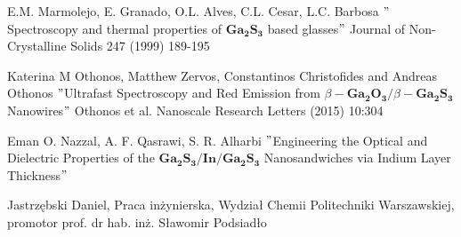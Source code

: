 \begin{thebibliography}{}
	 E.M. Marmolejo, E. Granado, O.L. Alves, C.L. Cesar, L.C. Barbosa $"$Spectroscopy and thermal properties of $\mathbf{Ga_{2}S_{3}}$ based glasses$"$ Journal of Non-Crystalline Solids 247 (1999) 189-195
	
	 Katerina M Othonos, Matthew Zervos, Constantinos Christofides and Andreas Othonos $"$Ultrafast Spectroscopy and Red Emission
	from $\beta-\mathbf{Ga_{2}O_{3}}/\beta-\mathbf{Ga_{2}S_{3}}$ Nanowires$"$ Othonos et al. Nanoscale Research Letters (2015) 10:304
	
	 Eman O. Nazzal, A. F. Qasrawi, S. R. Alharbi $"$Engineering the Optical and Dielectric Properties
	of the $\mathbf{Ga_{2}S_{3}/In/Ga_{2}S_{3}}$ Nanosandwiches via Indium Layer
	Thickness$"$
	
	 Jastrzębski Daniel, Praca inżynierska, Wydział Chemii Politechniki Warszawskiej, promotor prof. dr hab. inż. Sławomir Podsiadło
	
	
\end{thebibliography}














